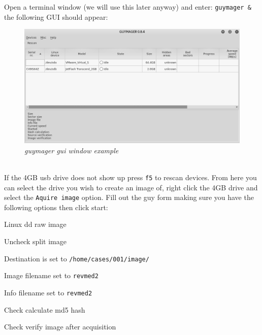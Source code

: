 \documentclass[a4paper,11pt]{article}
\begin{document}
Open a terminal window (we will use this later anyway) and enter: \texttt{guymager {\&}} the following GUI should appear:
\begin{figure}[h]
	\centering
	\includegraphics[scale=0.5]{guymager-window}
	\caption{\textit{guymager gui window example}}
	\label{fig:guymager-main-window}
\end{figure}
\\
If the 4GB usb drive does not show up press \texttt{f5} to rescan devices. From here you can select the drive you wish to create an image of, right click the 4GB drive and select the \texttt{Aquire image} option. Fill out the guy form making sure you have the following options then click start:
\begin{itemize*}
\item Linux dd raw image
\item Uncheck split image
\item Destination is set to \texttt{/home/cases/001/image/}
\item Image filename set to \texttt{revmed2}
\item Info filename set to \texttt{revmed2}
\item Check calculate md5 hash
\item Check verify image after acquisition
\end{itemize*}
\end{document}
